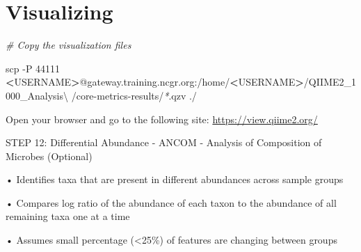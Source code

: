 \documentclass[
]{book}
\newenvironment{Shaded}{\begin{snugshade}}{\end{snugshade}}
\newcommand{\AttributeTok}[1]{\textcolor[rgb]{0.77,0.63,0.00}{#1}}
\newcommand{\CommentTok}[1]{\textcolor[rgb]{0.56,0.35,0.01}{\textit{#1}}}
\newcommand{\DataTypeTok}[1]{\textcolor[rgb]{0.13,0.29,0.53}{#1}}
\newcommand{\FunctionTok}[1]{\textcolor[rgb]{0.00,0.00,0.00}{#1}}
\newcommand{\NormalTok}[1]{#1}
\newcommand{\OperatorTok}[1]{\textcolor[rgb]{0.81,0.36,0.00}{\textbf{#1}}}
\newcommand{\PreprocessorTok}[1]{\textcolor[rgb]{0.56,0.35,0.01}{\textit{#1}}}
\begin{document}
\hypertarget{visualizing}{%
\section{Visualizing}\label{visualizing}}

\begin{Shaded}
\begin{Highlighting}[]
\CommentTok{\# Copy the visualization files}

\FunctionTok{scp} \AttributeTok{{-}P}\NormalTok{ 44111 }\OperatorTok{\textless{}}\NormalTok{USERNAME}\OperatorTok{\textgreater{}}\NormalTok{@gateway.training.ncgr.org:/home/}\OperatorTok{\textless{}}\NormalTok{USERNAME}\OperatorTok{\textgreater{}}\NormalTok{/QIIME2\_1000\_Analysis}\DataTypeTok{\textbackslash{}}
\NormalTok{/core{-}metrics{-}results/}\PreprocessorTok{*}\NormalTok{.qzv ./}
\end{Highlighting}
\end{Shaded}

Open your browser and go to the following site:
\url{https://view.qiime2.org/}

STEP 12: Differential Abundance - ANCOM - Analysis of Composition of Microbes (Optional)

• Identifies taxa that are present in different abundances across sample groups

• Compares log ratio of the abundance of each taxon to the abundance of all remaining taxa one at a time

• Assumes small percentage (\textless25\%) of features are changing between groups
\end{document}
